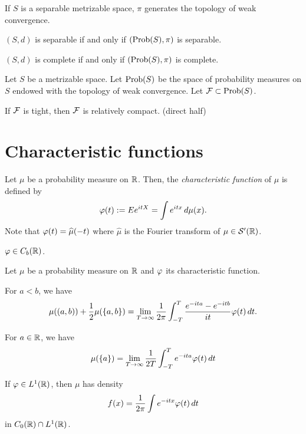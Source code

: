 \documentclass{../note}
\begin{document}
\begin{prb}
\begin{parts}
\item If $S$ is a separable metrizable space, $\pi$ generates the topology of weak convergence.
\item $(S,d)$ is separable if and only if $(\operatorname{Prob}(S),\pi)$ is separable.
\item $(S,d)$ is complete if and only if $(\operatorname{Prob}(S),\pi)$ is complete.
\end{parts}
\end{prb}

\begin{prb}
Let $S$ be a metrizable space.
Let $\operatorname{Prob}(S)$ be the space of probability measures on $S$ endowed with the topology of weak convergence.
Let $\mathcal{F}\subset\operatorname{Prob}(S)$.
\begin{parts}
\item 
\item If $\mathcal{F}$ is tight, then $\mathcal{F}$ is relatively compact. (direct half)
\end{parts}
\end{prb}




\section{Characteristic functions}

\begin{prb}
Let $\mu$ be a probability measure on $\mathbb{R}$.
Then, the \emph{characteristic function} of $\mu$ is defined by
\[\varphi(t):=Ee^{itX}=\int e^{itx}\,d\mu(x).\]
Note that $\varphi(t)=\widehat\mu(-t)$ where $\hat\mu$ is the Fourier transform of $\mu\in\mathcal{S}'(\mathbb{R})$.
\begin{parts}
\item $\varphi\in C_b(\mathbb{R})$.
\end{parts}
\end{prb}

\begin{prb}
Let $\mu$ be a probability measure on $\mathbb{R}$ and $\varphi$ its characteristic function.
\begin{parts}
\item For $a<b$, we have
\[\mu((a,b))+\frac12\mu(\{a,b\})=\lim_{T\to\infty}\frac1{2\pi}\int_{-T}^T\frac{e^{-ita}-e^{-itb}}{it}\varphi(t)\,dt.\]
\item For $a\in\mathbb{R}$, we have
\[\mu(\{a\})=\lim_{T\to\infty}\frac1{2T}\int_{-T}^Te^{-ita}\varphi(t)\,dt\]
\item If $\varphi\in L^1(\mathbb{R})$, then $\mu$ has density
\[f(x)=\frac1{2\pi}\int e^{-itx}\varphi(t)\,dt\]
in $C_0(\mathbb{R})\cap L^1(\mathbb{R})$.
\end{parts}
\end{prb}
\end{document}
